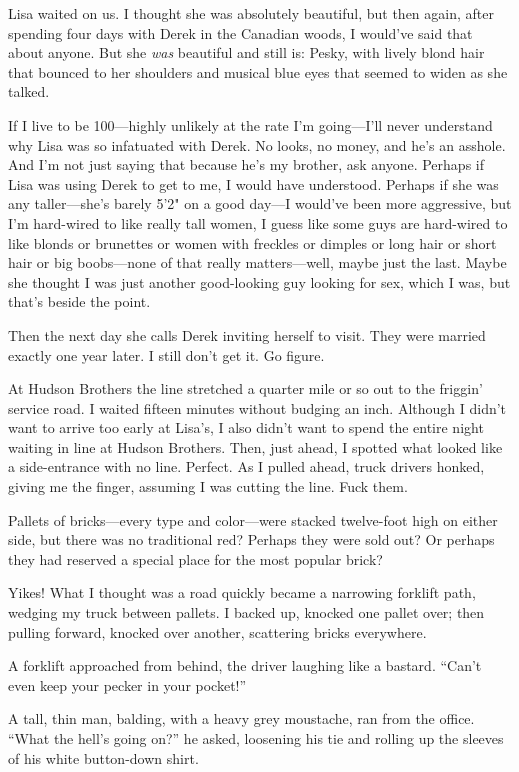Lisa waited on us. I thought she was absolutely beautiful, but then
again, after spending four days with Derek in the Canadian woods, I
would've said that about anyone. But she \emph{was} beautiful and still
is: Pesky, with lively blond hair that bounced to her shoulders and
musical blue eyes that seemed to widen as she talked.

If I live to be 100---highly unlikely at the rate I'm going---I'll never
understand why Lisa was so infatuated with Derek. No looks, no money,
and he's an asshole. And I'm not just saying that because he's my
brother, ask anyone. Perhaps if Lisa was using Derek to get to me, I
would have understood. Perhaps if she was any taller---she's barely 5'2"
on a good day---I would've been more aggressive, but I'm hard-wired to
like really tall women, I guess like some guys are hard-wired to like
blonds or brunettes or women with freckles or dimples or long hair or
short hair or big boobs---none of that really matters---well, maybe just
the last. Maybe she thought I was just another good-looking guy looking
for sex, which I was, but that's beside the point.

Then the next day she calls Derek inviting herself to visit. They were
married exactly one year later. I still don't get it. Go figure.

At Hudson Brothers the line stretched a quarter mile or so out to the
friggin' service road. I waited fifteen minutes without budging an inch.
Although I didn't want to arrive too early at Lisa's, I also didn't want
to spend the entire night waiting in line at Hudson Brothers. Then, just
ahead, I spotted what looked like a side-entrance with no line. Perfect.
As I pulled ahead, truck drivers honked, giving me the finger, assuming
I was cutting the line. Fuck them.

Pallets of bricks---every type and color---were stacked twelve-foot high
on either side, but there was no traditional red? Perhaps they were sold
out? Or perhaps they had reserved a special place for the most popular
brick?

Yikes! What I thought was a road quickly became a narrowing forklift
path, wedging my truck between pallets. I backed up, knocked one pallet
over; then pulling forward, knocked over another, scattering bricks
everywhere.

A forklift approached from behind, the driver laughing like a bastard.
``Can't even keep your pecker in your pocket!''

A tall, thin man, balding, with a heavy grey moustache, ran from the
office. ``What the hell's going on?'' he asked, loosening his tie and
rolling up the sleeves of his white button-down shirt.


